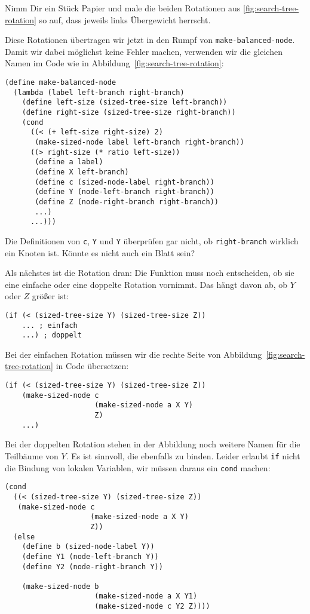 \begin{aufgabeinline}
  Nimm Dir ein Stück Papier und male die beiden Rotationen aus
  \ref{fig:search-tree-rotation} so auf, dass jeweils links
  Übergewicht herrscht.
\end{aufgabeinline}
%
Diese Rotationen übertragen wir jetzt in den Rumpf von
\lstinline{make-balanced-node}.  Damit wir dabei möglichst keine
Fehler machen, verwenden wir die gleichen Namen im Code wie in
Abbildung~\ref{fig:search-tree-rotation}:
%
\begin{lstlisting}
(define make-balanced-node
  (lambda (label left-branch right-branch)
    (define left-size (sized-tree-size left-branch))
    (define right-size (sized-tree-size right-branch))
    (cond
      ((< (+ left-size right-size) 2)
       (make-sized-node label left-branch right-branch))
      ((> right-size (* ratio left-size))
       (define a label)
       (define X left-branch)
       (define c (sized-node-label right-branch))
       (define Y (node-left-branch right-branch))
       (define Z (node-right-branch right-branch))
       ...)
      ...)))
\end{lstlisting}
%
\begin{aufgabeinline}
  Die Definitionen von \lstinline{c}, \lstinline{Y} und \lstinline{Y}
  überprüfen gar nicht, ob \lstinline{right-branch} wirklich ein
  Knoten ist.  Könnte es nicht auch ein Blatt sein?
\end{aufgabeinline}
%
Als nächstes ist die Rotation dran: Die Funktion muss noch
entscheiden, ob sie eine einfache oder eine doppelte Rotation
vornimmt.  Das hängt davon ab, ob $Y$ oder $Z$ größer ist:
%
\begin{lstlisting}
(if (< (sized-tree-size Y) (sized-tree-size Z))
    ... ; einfach
    ...) ; doppelt
\end{lstlisting}
%
Bei der einfachen Rotation müssen wir die rechte Seite von
Abbildung~\ref{fig:search-tree-rotation} in Code übersetzen:
%
\begin{lstlisting}
(if (< (sized-tree-size Y) (sized-tree-size Z))
    (make-sized-node c
                     (make-sized-node a X Y)
                     Z)
    ...)
\end{lstlisting}
%
Bei der doppelten Rotation stehen in der Abbildung noch weitere Namen
für die Teilbäume von $Y$.  Es ist sinnvoll, die ebenfalls zu binden.
Leider erlaubt \lstinline{if} nicht die Bindung von lokalen Variablen,
wir müssen daraus ein \lstinline{cond} machen:
%
\begin{lstlisting}
(cond
  ((< (sized-tree-size Y) (sized-tree-size Z))
   (make-sized-node c
                    (make-sized-node a X Y)
                    Z))
  (else
    (define b (sized-node-label Y))
    (define Y1 (node-left-branch Y))
    (define Y2 (node-right-branch Y))

    (make-sized-node b
                     (make-sized-node a X Y1)
                     (make-sized-node c Y2 Z))))
\end{lstlisting}
